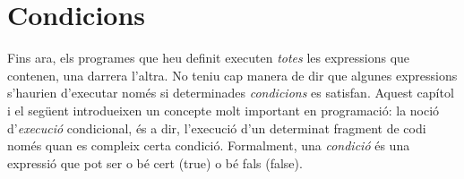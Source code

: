 \newcommand\partquatre{%
  \cleardoublepage
  \thispagestyle{plain}%
  \null\vfil
   \secdef\kkkpart\kkkpart}
\def\kkkpart[#1]#2{%
      \relax
      \refstepcounter{part}%
      \addcontentsline{toc}{part}{\thepart\hspace{1em}#1}%
    {\centering
     \interlinepenalty
     \normalfont
      \relax
       \huge\bfseries \partname\nobreakspace\thepart
       \par
       \vskip 20pt
     \Huge \bfseries #2\par}%
    \kkkendpart}
\def\kkkendpart{
\vspace*{3cm}
\begin{center}
\begin{minipage}{0.8\textwidth}
\textbf{ \noindent Fins ara, els vostres programes han executat totes i cada una de les seves expressions. No heu disposat de cap manera d'expressar que algunes parts d'un programa haurien de ser executades només si es compleixen certes condicions. En aquesta part, us presentem les expressions condicionals, que resolen aquest problema. Aquesta part també introdueix la noció de referències en l'espai bidimensional d'un pla i altres comportaments dels robots. Finalment us ensenyarem com utilitzar un robot per simular el comportament d'animals simples.}
\end{minipage}
\end{center}
	\vfil\newpage
                \null
                \thispagestyle{empty}}

\partquatre{Condicionals}

\chapter{Condicions}
\label{cap18}
Fins ara, els programes que heu definit executen \emph{totes} les expressions que contenen, una darrera l'altra. No teniu cap manera de dir que algunes expressions s'haurien d'executar només si determinades \emph{condicions} es satisfan. Aquest capítol i el següent introdueixen un concepte molt important en programació: la noció d'\emph{execució} condicional, és a dir, l'execució d'un determinat fragment de codi només quan es compleix certa condició. Formalment, una \emph{condició} és una expressió que pot ser o bé cert (\textsf{true}) o bé fals (\textsf{false}).

